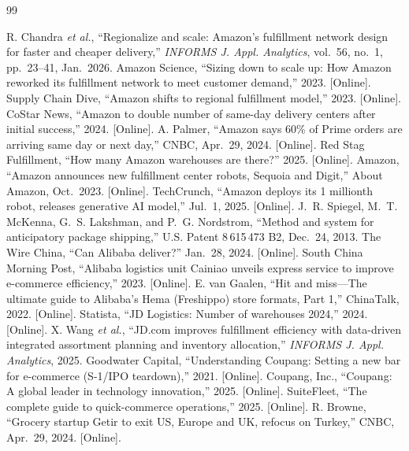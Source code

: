\documentclass[10pt,twocolumn,letterpaper]{article}
\theoremstyle{definition}
\begin{document}
\begin{thebibliography}{99}
\footnotesize

 R. Chandra \emph{et al.}, ``Regionalize and scale: Amazon's fulfillment network design for faster and cheaper delivery,'' \emph{INFORMS J. Appl. Analytics}, vol.~56, no.~1, pp.~23--41, Jan.~2026.
 Amazon Science, ``Sizing down to scale up: How Amazon reworked its fulfillment network to meet customer demand,'' 2023. [Online].
 Supply Chain Dive, ``Amazon shifts to regional fulfillment model,'' 2023. [Online].
 CoStar News, ``Amazon to double number of same-day delivery centers after initial success,'' 2024. [Online].
 A. Palmer, ``Amazon says 60\% of Prime orders are arriving same day or next day,'' CNBC, Apr.~29, 2024. [Online].
 Red Stag Fulfillment, ``How many Amazon warehouses are there?'' 2025. [Online].
 Amazon, ``Amazon announces new fulfillment center robots, Sequoia and Digit,'' About Amazon, Oct.~2023. [Online].
 TechCrunch, ``Amazon deploys its 1 millionth robot, releases generative AI model,'' Jul.~1, 2025. [Online].
 J.~R. Spiegel, M.~T. McKenna, G.~S. Lakshman, and P.~G. Nordstrom, ``Method and system for anticipatory package shipping,'' U.S. Patent 8\,615\,473 B2, Dec.~24, 2013.
 The Wire China, ``Can Alibaba deliver?'' Jan.~28, 2024. [Online].
 South China Morning Post, ``Alibaba logistics unit Cainiao unveils express service to improve e-commerce efficiency,'' 2023. [Online].
 E. van Gaalen, ``Hit and miss---The ultimate guide to Alibaba's Hema (Freshippo) store formats, Part 1,'' ChinaTalk, 2022. [Online].
 Statista, ``JD Logistics: Number of warehouses 2024,'' 2024. [Online].
 X. Wang \emph{et al.}, ``JD.com improves fulfillment efficiency with data-driven integrated assortment planning and inventory allocation,'' \emph{INFORMS J. Appl. Analytics}, 2025.
 Goodwater Capital, ``Understanding Coupang: Setting a new bar for e-commerce (S-1/IPO teardown),'' 2021. [Online].
 Coupang, Inc., ``Coupang: A global leader in technology innovation,'' 2025. [Online].
 SuiteFleet, ``The complete guide to quick-commerce operations,'' 2025. [Online].
 R. Browne, ``Grocery startup Getir to exit US, Europe and UK, refocus on Turkey,'' CNBC, Apr.~29, 2024. [Online].

\end{thebibliography}
\end{document}
